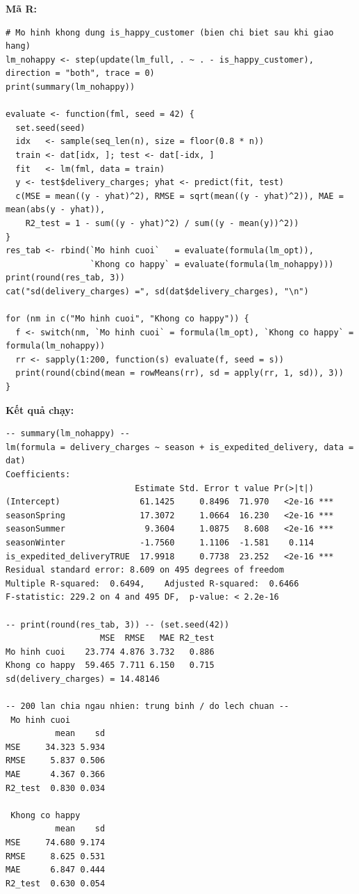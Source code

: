 \textbf{Mã R:}
\begin{lstlisting}
# Mo hinh khong dung is_happy_customer (bien chi biet sau khi giao hang)
lm_nohappy <- step(update(lm_full, . ~ . - is_happy_customer), direction = "both", trace = 0)
print(summary(lm_nohappy))

evaluate <- function(fml, seed = 42) {
  set.seed(seed)
  idx   <- sample(seq_len(n), size = floor(0.8 * n))
  train <- dat[idx, ]; test <- dat[-idx, ]
  fit   <- lm(fml, data = train)
  y <- test$delivery_charges; yhat <- predict(fit, test)
  c(MSE = mean((y - yhat)^2), RMSE = sqrt(mean((y - yhat)^2)), MAE = mean(abs(y - yhat)),
    R2_test = 1 - sum((y - yhat)^2) / sum((y - mean(y))^2))
}
res_tab <- rbind(`Mo hinh cuoi`   = evaluate(formula(lm_opt)),
                 `Khong co happy` = evaluate(formula(lm_nohappy)))
print(round(res_tab, 3))
cat("sd(delivery_charges) =", sd(dat$delivery_charges), "\n")

for (nm in c("Mo hinh cuoi", "Khong co happy")) {
  f <- switch(nm, `Mo hinh cuoi` = formula(lm_opt), `Khong co happy` = formula(lm_nohappy))
  rr <- sapply(1:200, function(s) evaluate(f, seed = s))
  print(round(cbind(mean = rowMeans(rr), sd = apply(rr, 1, sd)), 3))
}
\end{lstlisting}
\textbf{Kết quả chạy:}
\begin{lstlisting}[style=rout]
-- summary(lm_nohappy) --
lm(formula = delivery_charges ~ season + is_expedited_delivery, data = dat)
Coefficients:
                          Estimate Std. Error t value Pr(>|t|)    
(Intercept)                61.1425     0.8496  71.970   <2e-16 ***
seasonSpring               17.3072     1.0664  16.230   <2e-16 ***
seasonSummer                9.3604     1.0875   8.608   <2e-16 ***
seasonWinter               -1.7560     1.1106  -1.581    0.114    
is_expedited_deliveryTRUE  17.9918     0.7738  23.252   <2e-16 ***
Residual standard error: 8.609 on 495 degrees of freedom
Multiple R-squared:  0.6494,	Adjusted R-squared:  0.6466 
F-statistic: 229.2 on 4 and 495 DF,  p-value: < 2.2e-16

-- print(round(res_tab, 3)) -- (set.seed(42))
                   MSE  RMSE   MAE R2_test
Mo hinh cuoi    23.774 4.876 3.732   0.886
Khong co happy  59.465 7.711 6.150   0.715
sd(delivery_charges) = 14.48146 

-- 200 lan chia ngau nhien: trung binh / do lech chuan --
 Mo hinh cuoi
          mean    sd
MSE     34.323 5.934
RMSE     5.837 0.506
MAE      4.367 0.366
R2_test  0.830 0.034

 Khong co happy
          mean    sd
MSE     74.680 9.174
RMSE     8.625 0.531
MAE      6.847 0.444
R2_test  0.630 0.054
\end{lstlisting}

